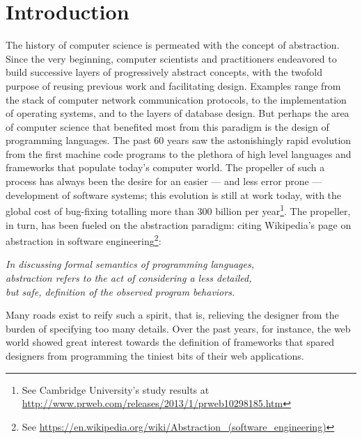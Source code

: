 \documentclass[12pt]{article} %
\begin{document}
\section{Introduction}
The history of computer science is permeated with the concept of abstraction. Since the very beginning, computer scientists and practitioners endeavored to build successive layers of progressively abstract concepts, with the twofold purpose of reusing previous work and facilitating design. Examples range from the stack of computer network communication protocols, to the implementation of operating systems, and to the layers of database design. But perhaps the area of computer science that benefited most from this paradigm is the design of programming languages. The past 60 years saw the astonishingly rapid evolution from the first machine code programs to the plethora of high level languages and frameworks that populate today's computer world. The propeller of such a process has always been the desire for an easier --- and less error prone --- development of software systems; this evolution is still at work today, with the global cost of bug-fixing totalling more than \textdollar{}300 billion per year\footnote{See Cambridge University's study results at \url{http://www.prweb.com/releases/2013/1/prweb10298185.htm}}. 
The propeller, in turn, has been fueled on the abstraction paradigm: citing Wikipedia's page on abstraction in software engineering\footnote{See \url{https://en.wikipedia.org/wiki/Abstraction_(software_engineering)}}:
\begin{shadequote*}
   \emph{In discussing formal semantics of programming languages, \\
   abstraction refers to the act of considering a less detailed, \\
   but safe, definition of the observed program behaviors.}
\end{shadequote*}
Many roads exist to reify such a spirit, that is, relieving the designer from the burden of specifying too many details. Over the past years, for instance, the web world showed great interest towards the definition of frameworks that spared designers from programming the tiniest bits of their web applications. 
\end{document}
